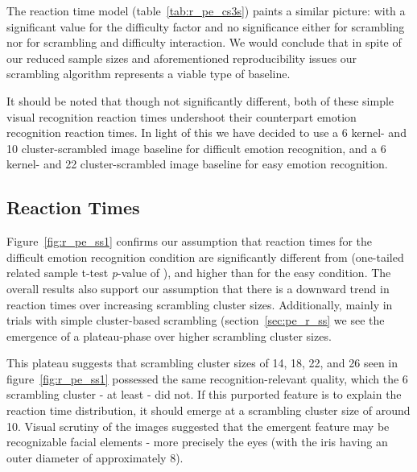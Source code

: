 	    The reaction time model (table~\ref{tab:r_pe_cs3s}) paints a similar picture: with a significant value for the difficulty factor and no significance either for scrambling nor for scrambling and difficulty interaction.
	    We would conclude that in spite of our reduced sample sizes and aforementioned reproducibility issues our scrambling algorithm represents a viable type of baseline.
	    
	    It should be noted that though not significantly different, both of these simple visual recognition reaction times undershoot their counterpart emotion recognition reaction times.
	    In light of this we have decided to use a \SI{6}{\pixel} kernel- and \SI{10}{\pixel} cluster-scrambled image baseline for difficult emotion recognition, 
	    and a \SI{6}{\pixel} kernel- and \SI{22}{\pixel} cluster-scrambled image baseline for easy emotion recognition.
	\subsection{Reaction Times}\label{sec:pe_d_rt}
	    Figure~\ref{fig:r_pe_ss1} confirms our assumption that reaction times for the difficult emotion recognition condition are significantly different from (one-tailed related sample t-test \textit{p}-value of 
	    ),
	    and higher than for the easy condition.
	    The overall results also support our assumption that there is a downward trend in reaction times over increasing scrambling cluster sizes.
	    Additionally, mainly in trials with simple cluster-based scrambling (section~\ref{sec:pe_r_ss} we see the emergence of a plateau-phase over higher scrambling cluster sizes.
	    
	    This plateau suggests that scrambling cluster sizes of \SI{14}{\pixel}, \SI{18}{\pixel}, \SI{22}{\pixel}, and \SI{26}{\pixel} seen in figure~\ref{fig:r_pe_ss1} possessed the same recognition-relevant quality, which the \SI{6}{\pixel} scrambling cluster - at least - did not.
	    If this purported feature is to explain the reaction time distribution, it should emerge at a scrambling cluster size of around \SI{10}{\pixel}.
	    Visual scrutiny of the images suggested that the emergent feature may be recognizable facial elements - more precisely the eyes (with the iris having an outer diameter of approximately \SI{8}{\pixel}).
	    

